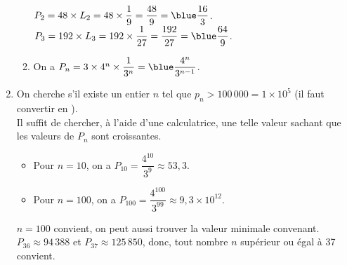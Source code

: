 \begin{corrige}
\begin{enumerate}
\begin{enumerate}
               $P_2 =48\times L_2 =48\times\dfrac19 =\dfrac{48}{9} ={\blue \dfrac{16}{3}}$. \\ [1mm]                                                                                                                                                    
               $P_3 =192\times L_3 =192\times\dfrac{1}{27} =\dfrac{192}{27} ={\blue \dfrac{64}{9}}$. \\ [1mm]
            \item On a $P_n =3\times4^n\times\dfrac{1}{3^n} ={\blue \dfrac{4^n}{3^{n-1}}}$. \smallskip
         \end{enumerate}
      \setcounter{enumi}{3}
      \item On cherche s'il existe un entier $n$ tel que $p_n>100\,000 =1\times10^5$ (il faut convertir  en \ucm{}). \\
         Il suffit de chercher, à l'aide d'une calculatrice, une telle valeur sachant que les valeurs de $P_n$ sont croissantes.
         \begin{itemize}
            \item Pour $n =10$, on a $P_{10} =\dfrac{4^{10}}{3^9} \approx53,3$. \smallskip
            \item Pour $n =100$, on a $P_{100} =\dfrac{4^{100}}{3^{99}} \approx9,3\times10^{12}$. \smallskip
         \end{itemize}
         $n =100$ convient, on peut aussi trouver la valeur minimale convenant. \\
         $P_{36} \approx94\,388$ et $P_{37} \approx 125\,850$, donc, {\blue tout nombre $n$ supérieur ou égal à 37 convient}.
   \end{enumerate}
\end{corrige}


